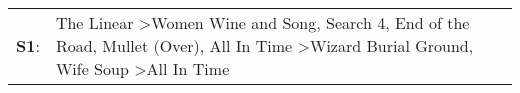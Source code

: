 \begin{supertabular}{p{0.03\textwidth}p{0.92\textwidth}}
 \textbf{S1}:  &  The Linear\textsuperscript{} \textgreater \enspace Women Wine and Song\textsuperscript{}, \enspace Search 4\textsuperscript{}, \enspace End of the Road\textsuperscript{}, \enspace Mullet (Over)\textsuperscript{}, \enspace All In Time\textsuperscript{} \textgreater \enspace Wizard Burial Ground\textsuperscript{}, \enspace Wife Soup\textsuperscript{} \textgreater \enspace All In Time\textsuperscript{}  \enspace  \\
\end{supertabular}
